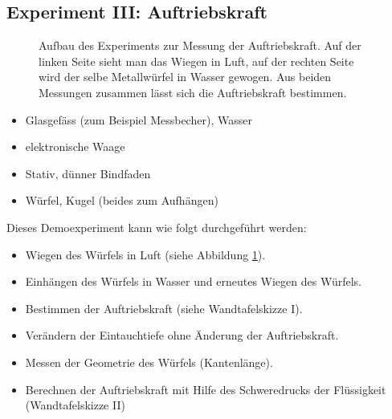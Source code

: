 
\subsection*{Experiment III: Auftriebskraft}\label{Experiment3}
\begin{figure}
\caption{Aufbau des Experiments zur Messung der Auftriebskraft. Auf der linken Seite sieht man das Wiegen in Luft, auf der rechten Seite wird
der selbe Metallwürfel in Wasser gewogen. Aus beiden Messungen zusammen lässt sich die Auftriebskraft bestimmen.}
\label{Fotoexperiment}
\end{figure} 

\begin{itemize}
	\item Glasgefäss (zum Beispiel Messbecher), Wasser
	\item elektronische Waage
	\item Stativ, dünner Bindfaden
	\item Würfel, Kugel (beides zum Aufhängen)
\end{itemize}

Dieses Demoexperiment kann wie folgt durchgeführt werden:





\begin{itemize}
	\item Wiegen des Würfels in Luft (siehe Abbildung \ref{Fotoexperiment}).
	\item Einhängen des Würfels in Wasser und erneutes Wiegen des Würfels.
	\item Bestimmen der Auftriebskraft (siehe Wandtafelskizze I).
	\item Verändern der Eintauchtiefe ohne Änderung der Auftriebskraft.
	\item Messen der Geometrie des Würfels (Kantenlänge).
	\item Berechnen der Auftriebskraft mit Hilfe des Schweredrucks der Flüssigkeit (Wandtafelskizze II)
\end{itemize}


